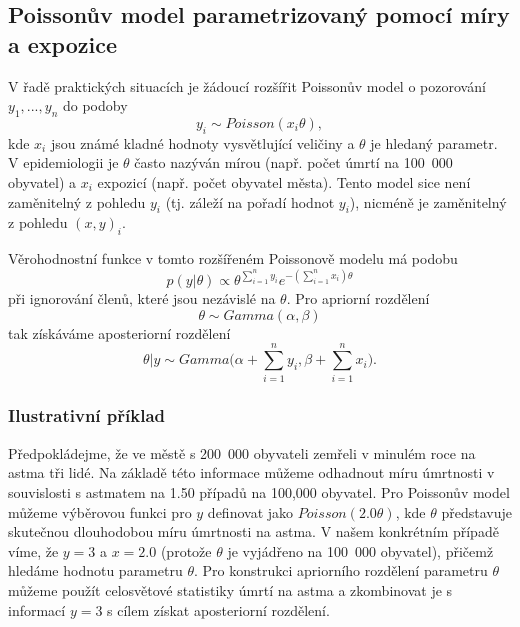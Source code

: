 \subsection{Poissonův model parametrizovaný pomocí míry a expozice}

V řadě praktických situacích je žádoucí rozšířit Poissonův model o pozorování $y_1, ..., y_n$ do podoby
\begin{equation}
y_i \sim \textit{Poisson}(x_i\theta),
\end{equation}
kde $x_i$ jsou známé kladné hodnoty vysvětlující veličiny a $\theta$ je hledaný parametr. V epidemiologii je $\theta$ často nazýván mírou (např. počet úmrtí na 100~000 obyvatel) a $x_i$ expozicí (např. počet obyvatel města). Tento model sice není zaměnitelný z pohledu $y_i$ (tj. záleží na pořadí hodnot $y_i$), nicméně je zaměnitelný z pohledu $(x, y)_i$.

Věrohodnostní funkce v tomto rozšířeném Poissonově modelu má podobu
\begin{equation}
p(y|\theta) \varpropto \theta^{\sum_{i = 1}^n y_i} e^{-(\sum_{i = 1}^n x_i) \theta}
\end{equation}
při ignorování členů, které jsou nezávislé na $\theta$. Pro apriorní rozdělení
\begin{equation}
\theta \sim \textit{Gamma}(\alpha, \beta)
\end{equation}
tak získáváme aposteriorní rozdělení
\begin{equation}
\theta | y \sim \textit{Gamma}\Big(\alpha + \sum_{i = 1}^n y_i, \beta + \sum_{i = 1}^n x_i \Big).
\end{equation}

\subsubsection{Ilustrativní příklad}

Předpokládejme, že ve městě s 200~000 obyvateli zemřeli v minulém roce na astma tři lidé. Na základě této informace můžeme odhadnout míru úmrtnosti v souvislosti s astmatem na 1.50 případů na 100,000 obyvatel. Pro Poissonův model můžeme výběrovou funkci pro $y$ definovat jako $Poisson(2.0 \theta)$, kde $\theta$ představuje skutečnou dlouhodobou míru úmrtnosti na astma. V našem konkrétním případě víme, že $y = 3$ a $x = 2.0$ (protože $\theta$ je vyjádřeno na 100~000 obyvatel), přičemž hledáme hodnotu parametru $\theta$. Pro konstrukci apriorního rozdělení parametru $\theta$ můžeme použít celosvětové statistiky úmrtí na astma a zkombinovat je s informací $y = 3$ s cílem získat aposteriorní rozdělení.


